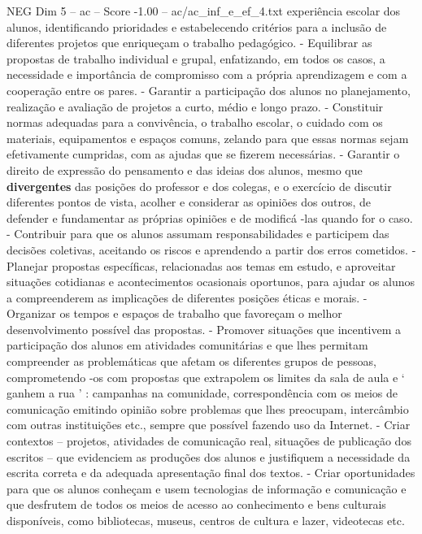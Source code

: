 \begin{textsample}{NEG Dim 5 – ac – Score -1.00 – ac/ac\_inf\_e\_ef\_4.txt}
experiência escolar dos alunos, identificando prioridades e estabelecendo critérios para a inclusão de diferentes projetos que enriqueçam o trabalho pedagógico. - Equilibrar as propostas de trabalho individual e grupal, enfatizando, em todos os casos, a necessidade e importância de compromisso com a própria aprendizagem e com a cooperação entre os pares. - Garantir a participação dos alunos no planejamento, realização e avaliação de projetos a curto, médio e longo prazo. - Constituir normas adequadas para a convivência, o trabalho escolar, o cuidado com os materiais, equipamentos e espaços comuns, zelando para que essas normas sejam efetivamente cumpridas, com as ajudas que se fizerem necessárias. - Garantir o direito de expressão do pensamento e das ideias dos alunos, mesmo que \textbf{divergentes} das posições do professor e dos colegas, e o exercício de discutir diferentes pontos de vista, acolher e considerar as opiniões dos outros, de defender e fundamentar as próprias opiniões e de modificá -las quando for o caso. - Contribuir para que os alunos assumam responsabilidades e participem das decisões coletivas, aceitando os riscos e aprendendo a partir dos erros cometidos. - Planejar propostas específicas, relacionadas aos temas em estudo, e aproveitar situações cotidianas e acontecimentos ocasionais oportunos, para ajudar os alunos a compreenderem as implicações de diferentes posições éticas e morais. - Organizar os tempos e espaços de trabalho que favoreçam o melhor desenvolvimento possível das propostas. - Promover situações que incentivem a participação dos alunos em atividades comunitárias e que lhes permitam compreender as problemáticas que afetam os diferentes grupos de pessoas, comprometendo -os com propostas que extrapolem os limites da sala de aula e ‘ ganhem a rua ’ : campanhas na comunidade, correspondência com os meios de comunicação emitindo opinião sobre problemas que lhes preocupam, intercâmbio com outras instituições etc., sempre que possível fazendo uso da Internet. - Criar contextos – projetos, atividades de comunicação real, situações de publicação dos escritos – que evidenciem as produções dos alunos e justifiquem a necessidade da escrita correta e da adequada apresentação final dos textos. - Criar oportunidades para que os alunos conheçam e usem tecnologias de informação e comunicação e que desfrutem de todos os meios de acesso ao conhecimento e bens culturais disponíveis, como bibliotecas, museus, centros de cultura e lazer, videotecas etc.

\end{textsample}
